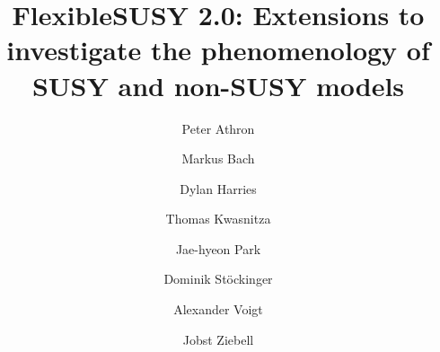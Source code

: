 \documentclass[final,3p,11pt,pdflatex]{elsarticle}
\begin{document}
\begin{frontmatter}
 \vspace*{0.5cm}
 \title{\Large\bf FlexibleSUSY 2.0: Extensions to investigate the phenomenology of SUSY and non-SUSY models}

\author[Monash]{Peter Athron}
\author[dresden]{Markus Bach}
\author[adelaide,prague]{Dylan Harries}
\author[dresden]{Thomas Kwasnitza}
\author[kiasquc]{Jae-hyeon Park}
\author[dresden]{Dominik St\"ockinger}
\author[rwth]{Alexander Voigt}
\author[dresden]{Jobst Ziebell}
\address[Monash]{ARC Centre of Excellence for Particle Physics at
  the Terascale, School of Physics, Monash University, Melbourne,
  Victoria 3800, Australia}
\address[dresden]{Institut f\"ur Kern- und Teilchenphysik,
TU Dresden, Zellescher Weg 19, 01069 Dresden, Germany}
\address[adelaide]{ARC Centre of Excellence for Particle Physics at
the Terascale, Department of Physics, The University of Adelaide,
Adelaide, South Australia 5005, Australia}
\address[prague]{Institute of Particle and Nuclear Physics, Faculty of
  Mathematics and Physics, Charles University in Prague, V
  Hole\v{s}ovi\v{c}k\'{a}ch 2, 180 00 Praha 8, Czech Republic}
\address[kiasquc]{Quantum Universe Center,
Korea Institute for Advanced Study,
85 Hoegiro Dongdaemungu,
Seoul 02455, Republic of Korea}
\address[rwth]{Institute for Theoretical Particle Physics and Cosmology, RWTH Aachen University, 52074 Aachen, Germany}


\end{frontmatter}
\end{document}
